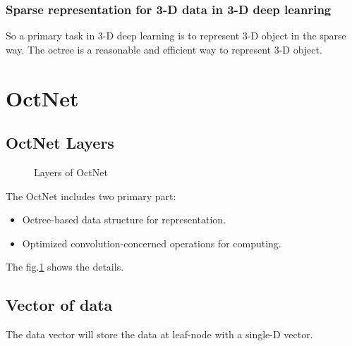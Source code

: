 \documentclass[border=0.5in]{blog}
\begin{document}
    \subsubsection{Sparse representation for 3-D data in 3-D deep leanring}
    \label{sec:rbm:bm:spare-r}
   
    So a primary task in 3-D deep learning is to represent 3-D object in the sparse way.
    The octree is a reasonable and efficient way to represent 3-D object.
    
    \section{OctNet}
    \label{sec:octnet}
    
    \subsection{OctNet Layers}
    \label{sec:octnet:struct}
    
    \begin{figure}
    \centering
    \caption{Layers of OctNet}
    \label{fig:octenet:layers}
    \end{figure}

    The OctNet includes two primary part:
    \begin{itemize}
        \item Octree-based data structure for representation.
        \item Optimized convolution-concerned operations for computing.
    \end{itemize}
    The fig.\ref{fig:octenet:layers} shows the details.
    
    \subsection{Vector of data}
    \label{sec:octnet:vd}
    
    The data vector will store the data at leaf-node with a single-D vector.
    
\end{document}
